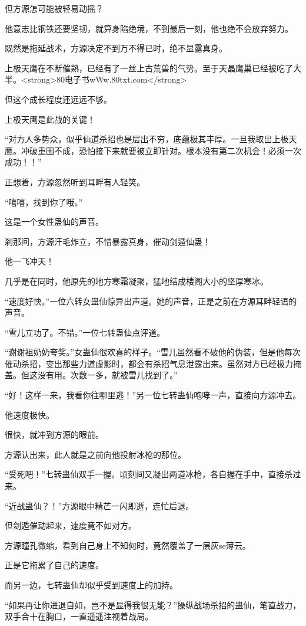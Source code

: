 \begin{this_body}
但方源怎可能被轻易动摇？

他意志比钢铁还要坚韧，就算身陷绝境，不到最后一刻，他也绝不会放弃努力。

既然是拖延战术，方源决定不到万不得已时，绝不显露真身。

上极天鹰在不断催熟，已经有了一丝上古荒兽的气势。至于天晶鹰巢已经被吃了大半。<strong>80电子书wWw.80txt.com</strong>

但这个成长程度还远远不够。

上极天鹰是此战的关键！

“对方人多势众，似乎仙道杀招也是层出不穷，底蕴极其丰厚。一旦我取出上极天鹰。冲破重围不成，恐怕接下来就要被立即针对。根本没有第二次机会！必须一次成功！！”

正想着，方源忽然听到耳畔有人轻笑。

“嘻嘻，找到你了哦。”

这是一个女性蛊仙的声音。

刹那间，方源汗毛炸立，不惜暴露真身，催动剑遁仙蛊！

他一飞冲天！

几乎是在同时，他原先的地方寒霜凝聚，猛地结成楼阁大小的坚厚寒冰。

“速度好快。”一位六转女蛊仙惊异出声道。她的声音，正是之前在方源耳畔轻语的声音。

“雪儿立功了。不错。”一位七转蛊仙点评道。

“谢谢祖奶奶夸奖。”女蛊仙很欢喜的样子。“雪儿虽然看不破他的伪装，但是他每次催动杀招，变出那些力道虚影时，都会有杀招气息泄露出来。虽然对方已经极力掩盖。但这没有用。次数一多，就被雪儿找到了。”

“好！这样一来，我看你往哪里逃！”另一位七转蛊仙咆哮一声，直接向方源冲去。

他速度极快。

很快，就冲到方源的眼前。

方源认出来，此人就是之前向他投射冰枪的那位。

“受死吧！”七转蛊仙双手一握。顷刻间又凝出两道冰枪，各自握在手中，直接杀过来。

“近战蛊仙？！”方源眼中精芒一闪即逝，连忙后退。

但剑遁催动起来，速度竟不如对方。

方源瞳孔微缩，看到自己身上不知何时，竟然覆盖了一层灰se薄云。

正是它拖累了自己的速度。

而另一边，七转蛊仙却似乎受到速度上的加持。

“如果再让你进退自如，岂不是显得我很无能？”操纵战场杀招的蛊仙，笔直战力，双手合十在胸口，一直遥遥注视着战局。


\end{this_body}
